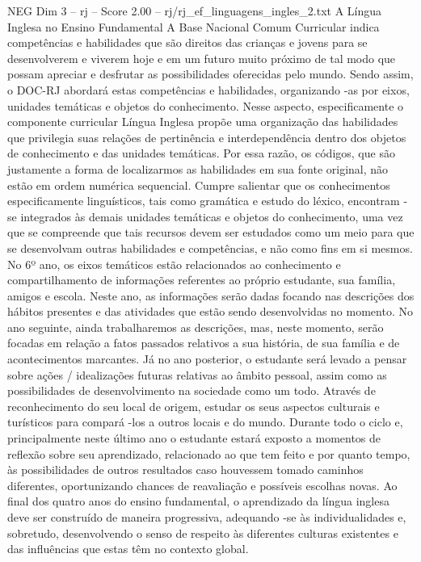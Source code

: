 \begin{textsample}{NEG Dim 3 – rj – Score 2.00 – rj/rj\_ef\_linguagens\_ingles\_2.txt}  \label{ex:f3_neg_280}
A Língua Inglesa no Ensino Fundamental A Base Nacional Comum Curricular indica competências e habilidades que são direitos das crianças e jovens para se desenvolverem e viverem hoje e em um futuro muito próximo de tal modo que possam apreciar e desfrutar as possibilidades oferecidas pelo mundo.
Sendo assim, o DOC-RJ abordará estas competências e habilidades, organizando -as por eixos, unidades temáticas e objetos do conhecimento.
Nesse aspecto, especificamente o componente curricular Língua Inglesa propõe uma organização das habilidades que privilegia suas relações de pertinência e interdependência dentro dos objetos de conhecimento e das unidades temáticas.
Por essa razão, os códigos, que são justamente a forma de localizarmos as habilidades em sua fonte original, não estão em ordem numérica sequencial.
Cumpre salientar que os conhecimentos especificamente linguísticos, tais como gramática e estudo do léxico, encontram -se integrados às demais unidades temáticas e objetos do conhecimento, uma vez que se compreende que tais recursos devem ser estudados como um meio para que se desenvolvam outras habilidades e competências, e não como fins em si mesmos.
No 6º ano, os eixos temáticos estão relacionados ao conhecimento e compartilhamento de informações referentes ao próprio estudante, sua família, amigos e escola.
Neste ano, as informações serão dadas focando nas descrições dos hábitos presentes e das atividades que estão sendo desenvolvidas no momento.
No ano seguinte, ainda trabalharemos as descrições, mas, neste momento, serão focadas em relação a fatos passados relativos a sua história, de sua família e de acontecimentos marcantes.
Já no ano posterior, o estudante será levado a pensar sobre ações / idealizações futuras relativas ao âmbito pessoal, assim como as possibilidades de desenvolvimento na sociedade como um todo.
Através de reconhecimento do seu local de origem, estudar os seus aspectos culturais e turísticos para compará -los a outros locais e do mundo.
Durante todo o ciclo e, principalmente neste último ano o estudante estará exposto a momentos de reflexão sobre seu aprendizado, relacionado ao que tem feito e por quanto tempo, às possibilidades de outros resultados caso houvessem tomado caminhos diferentes, oportunizando chances de reavaliação e possíveis escolhas novas.
Ao final dos quatro anos do ensino fundamental, o aprendizado da língua inglesa deve ser construído de maneira progressiva, adequando -se às individualidades e, sobretudo, desenvolvendo o senso de respeito às diferentes culturas existentes e das influências que estas têm no contexto global.

\end{textsample}
